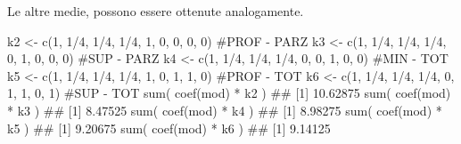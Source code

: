 \documentclass[a4paper,12pt,oneside]{book}
\newenvironment{Shaded}{}{}
\newcommand{\KeywordTok}[1]{#1}
\newcommand{\DecValTok}[1]{#1}
\newcommand{\StringTok}[1]{#1}
\newcommand{\CommentTok}[1]{#1}
\newcommand{\OperatorTok}[1]{#1}
\newcommand{\NormalTok}[1]{#1}
\begin{document}
Le altre medie, possono essere ottenute analogamente.

\begin{Shaded}
\begin{Highlighting}[]
\NormalTok{k2 <-}\StringTok{ }\KeywordTok{c}\NormalTok{(}\DecValTok{1}\NormalTok{, }\DecValTok{1}\OperatorTok{/}\DecValTok{4}\NormalTok{, }\DecValTok{1}\OperatorTok{/}\DecValTok{4}\NormalTok{, }\DecValTok{1}\OperatorTok{/}\DecValTok{4}\NormalTok{, }\DecValTok{1}\NormalTok{, }\DecValTok{0}\NormalTok{, }\DecValTok{0}\NormalTok{, }\DecValTok{0}\NormalTok{, }\DecValTok{0}\NormalTok{) }\CommentTok{#PROF - PARZ}
\NormalTok{k3 <-}\StringTok{ }\KeywordTok{c}\NormalTok{(}\DecValTok{1}\NormalTok{, }\DecValTok{1}\OperatorTok{/}\DecValTok{4}\NormalTok{, }\DecValTok{1}\OperatorTok{/}\DecValTok{4}\NormalTok{, }\DecValTok{1}\OperatorTok{/}\DecValTok{4}\NormalTok{, }\DecValTok{0}\NormalTok{, }\DecValTok{1}\NormalTok{, }\DecValTok{0}\NormalTok{, }\DecValTok{0}\NormalTok{, }\DecValTok{0}\NormalTok{) }\CommentTok{#SUP - PARZ}
\NormalTok{k4 <-}\StringTok{ }\KeywordTok{c}\NormalTok{(}\DecValTok{1}\NormalTok{, }\DecValTok{1}\OperatorTok{/}\DecValTok{4}\NormalTok{, }\DecValTok{1}\OperatorTok{/}\DecValTok{4}\NormalTok{, }\DecValTok{1}\OperatorTok{/}\DecValTok{4}\NormalTok{, }\DecValTok{0}\NormalTok{, }\DecValTok{0}\NormalTok{, }\DecValTok{1}\NormalTok{, }\DecValTok{0}\NormalTok{, }\DecValTok{0}\NormalTok{) }\CommentTok{#MIN - TOT}
\NormalTok{k5 <-}\StringTok{ }\KeywordTok{c}\NormalTok{(}\DecValTok{1}\NormalTok{, }\DecValTok{1}\OperatorTok{/}\DecValTok{4}\NormalTok{, }\DecValTok{1}\OperatorTok{/}\DecValTok{4}\NormalTok{, }\DecValTok{1}\OperatorTok{/}\DecValTok{4}\NormalTok{, }\DecValTok{1}\NormalTok{, }\DecValTok{0}\NormalTok{, }\DecValTok{1}\NormalTok{, }\DecValTok{1}\NormalTok{, }\DecValTok{0}\NormalTok{) }\CommentTok{#PROF - TOT}
\NormalTok{k6 <-}\StringTok{ }\KeywordTok{c}\NormalTok{(}\DecValTok{1}\NormalTok{, }\DecValTok{1}\OperatorTok{/}\DecValTok{4}\NormalTok{, }\DecValTok{1}\OperatorTok{/}\DecValTok{4}\NormalTok{, }\DecValTok{1}\OperatorTok{/}\DecValTok{4}\NormalTok{, }\DecValTok{0}\NormalTok{, }\DecValTok{1}\NormalTok{, }\DecValTok{1}\NormalTok{, }\DecValTok{0}\NormalTok{, }\DecValTok{1}\NormalTok{) }\CommentTok{#SUP - TOT}
\KeywordTok{sum}\NormalTok{( }\KeywordTok{coef}\NormalTok{(mod) }\OperatorTok{*}\StringTok{ }\NormalTok{k2 )}
\CommentTok{## [1] 10.62875}
\KeywordTok{sum}\NormalTok{( }\KeywordTok{coef}\NormalTok{(mod) }\OperatorTok{*}\StringTok{ }\NormalTok{k3 )}
\CommentTok{## [1] 8.47525}
\KeywordTok{sum}\NormalTok{( }\KeywordTok{coef}\NormalTok{(mod) }\OperatorTok{*}\StringTok{ }\NormalTok{k4 )}
\CommentTok{## [1] 8.98275}
\KeywordTok{sum}\NormalTok{( }\KeywordTok{coef}\NormalTok{(mod) }\OperatorTok{*}\StringTok{ }\NormalTok{k5 )}
\CommentTok{## [1] 9.20675}
\KeywordTok{sum}\NormalTok{( }\KeywordTok{coef}\NormalTok{(mod) }\OperatorTok{*}\StringTok{ }\NormalTok{k6 )}
\CommentTok{## [1] 9.14125}
\end{Highlighting}
\end{Shaded}
\end{document}
